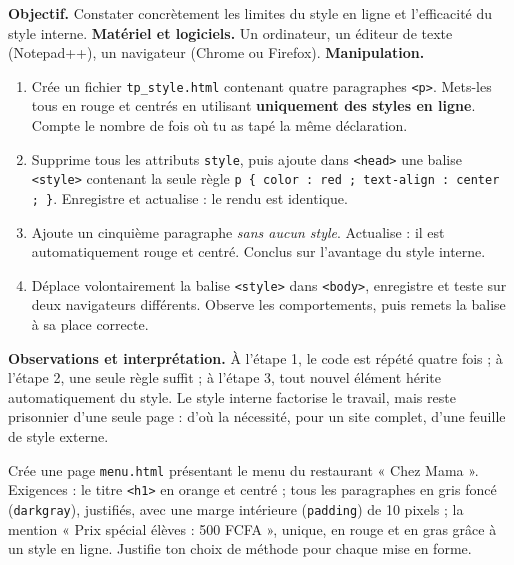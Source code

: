 \documentclass[11pt]{article}
\begin{document}
\begin{experience}
\textbf{Objectif.} Constater concrètement les limites du style en ligne et l'efficacité du style interne.
\textbf{Matériel et logiciels.} Un ordinateur, un éditeur de texte (Notepad++), un navigateur (Chrome ou Firefox).
\textbf{Manipulation.}
\begin{enumerate}
    \item Crée un fichier \texttt{tp\_style.html} contenant quatre paragraphes \texttt{<p>}. Mets-les tous en rouge et centrés en utilisant \textbf{uniquement des styles en ligne}. Compte le nombre de fois où tu as tapé la même déclaration.
    \item Supprime tous les attributs \texttt{style}, puis ajoute dans \texttt{<head>} une balise \texttt{<style>} contenant la seule règle \texttt{p \{ color : red ; text-align : center ; \}}. Enregistre et actualise : le rendu est identique.
    \item Ajoute un cinquième paragraphe \emph{sans aucun style}. Actualise : il est automatiquement rouge et centré. Conclus sur l'avantage du style interne.
    \item Déplace volontairement la balise \texttt{<style>} dans \texttt{<body>}, enregistre et teste sur deux navigateurs différents. Observe les comportements, puis remets la balise à sa place correcte.
\end{enumerate}
\textbf{Observations et interprétation.} À l'étape 1, le code est répété quatre fois ; à l'étape 2, une seule règle suffit ; à l'étape 3, tout nouvel élément hérite automatiquement du style. Le style interne factorise le travail, mais reste prisonnier d'une seule page : d'où la nécessité, pour un site complet, d'une feuille de style externe.
\end{experience}

\begin{exercice}
Crée une page \texttt{menu.html} présentant le menu du restaurant « Chez Mama ». Exigences : le titre \texttt{<h1>} en orange et centré ; tous les paragraphes en gris foncé (\texttt{darkgray}), justifiés, avec une marge intérieure (\texttt{padding}) de 10 pixels ; la mention « Prix spécial élèves : 500 FCFA », unique, en rouge et en gras grâce à un style en ligne. Justifie ton choix de méthode pour chaque mise en forme.
\end{exercice}
\end{document}
